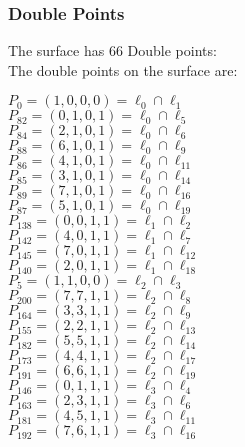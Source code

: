 \documentclass{article}
\begin{document}
{\subsubsection*{Double Points}
The surface has 66 Double points:\\
The double points on the surface are:\\
\begin{multicols}{2}
\noindent
$P_{0} = ( 1, 0, 0, 0 ) = \ell_{0} \cap \ell_{1} $\\
$P_{82} = ( 0, 1, 0, 1 ) = \ell_{0} \cap \ell_{5} $\\
$P_{84} = ( 2, 1, 0, 1 ) = \ell_{0} \cap \ell_{6} $\\
$P_{88} = ( 6, 1, 0, 1 ) = \ell_{0} \cap \ell_{9} $\\
$P_{86} = ( 4, 1, 0, 1 ) = \ell_{0} \cap \ell_{11} $\\
$P_{85} = ( 3, 1, 0, 1 ) = \ell_{0} \cap \ell_{14} $\\
$P_{89} = ( 7, 1, 0, 1 ) = \ell_{0} \cap \ell_{16} $\\
$P_{87} = ( 5, 1, 0, 1 ) = \ell_{0} \cap \ell_{19} $\\
$P_{138} = ( 0, 0, 1, 1 ) = \ell_{1} \cap \ell_{2} $\\
$P_{142} = ( 4, 0, 1, 1 ) = \ell_{1} \cap \ell_{7} $\\
$P_{145} = ( 7, 0, 1, 1 ) = \ell_{1} \cap \ell_{12} $\\
$P_{140} = ( 2, 0, 1, 1 ) = \ell_{1} \cap \ell_{18} $\\
$P_{5} = ( 1, 1, 0, 0 ) = \ell_{2} \cap \ell_{3} $\\
$P_{200} = ( 7, 7, 1, 1 ) = \ell_{2} \cap \ell_{8} $\\
$P_{164} = ( 3, 3, 1, 1 ) = \ell_{2} \cap \ell_{9} $\\
$P_{155} = ( 2, 2, 1, 1 ) = \ell_{2} \cap \ell_{13} $\\
$P_{182} = ( 5, 5, 1, 1 ) = \ell_{2} \cap \ell_{14} $\\
$P_{173} = ( 4, 4, 1, 1 ) = \ell_{2} \cap \ell_{17} $\\
$P_{191} = ( 6, 6, 1, 1 ) = \ell_{2} \cap \ell_{19} $\\
$P_{146} = ( 0, 1, 1, 1 ) = \ell_{3} \cap \ell_{4} $\\
$P_{163} = ( 2, 3, 1, 1 ) = \ell_{3} \cap \ell_{6} $\\
$P_{181} = ( 4, 5, 1, 1 ) = \ell_{3} \cap \ell_{11} $\\
$P_{192} = ( 7, 6, 1, 1 ) = \ell_{3} \cap \ell_{16} $\\

\end{multicols}}
\end{document}
